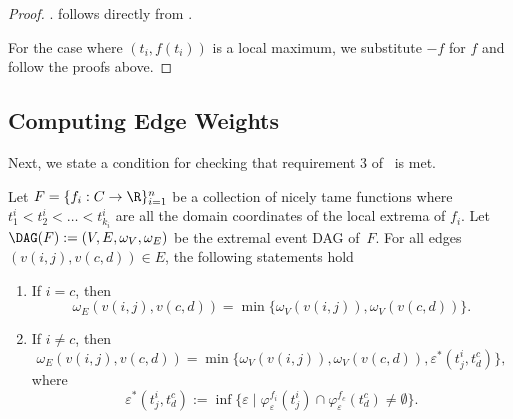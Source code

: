 \begin{proof}
    .
    follows directly from
    \cite[Proposition 4]{BerryUsing20}.

    For the case where $(t_i, f(t_i))$ is a local  maximum,
    we substitute $-f$ for $f$ and follow the proofs above.
\end{proof}

\subsection{Computing Edge Weights}

Next, we state a condition for checking that requirement  3 of~ is met.

\begin{thm}

    Let $F=\{f_i:C \rightarrow \R\}_{i=1}^n$ be a collection of nicely tame
    functions where $t_1^i<t_2^i<\dots <t_{k_i}^i$ are all the domain coordinates of the local extrema of
    $f_i$. Let \mbox{$\DAG(F) := (V,E,\omega_V,\omega_E)$} be the extremal event DAG
    of~$F$. For all edges~$(v(i,j), v(c,d)) \in E$, the following statements hold

    \begin{enumerate}
        \item If $i=c$, then
            $$\omega_{E}(v(i,j), v(c,d)) = \min\{\omega_V(v(i,j)), \omega_V(v(c,d))\}.$$ \label{stmt:edge-weights-same}
        \item If $i\neq c$, then
            $$\omega_{E}(v(i,j), v(c,d))=\min\{\omega_V(v(i,j)), \omega_V(v(c,d)), \varepsilon^*(t_j^i, t_d^c)\},$$
            where
            $$\varepsilon^*(t_j^i, t_d^c) := \inf\{\varepsilon \mid \varphi^{f_i}_{\varepsilon}(t_j^i) \cap \varphi^{f_c}_{\varepsilon}(t_d^c) \neq \emptyset\}.$$
            \label{stmt:edge-weights-dif}
    \end{enumerate}
    \label{thm:edge-weights}
\end{thm}

